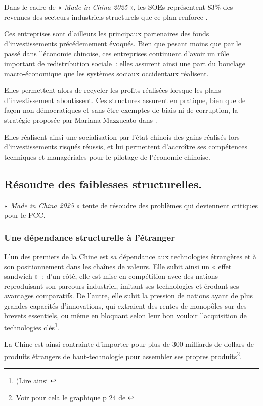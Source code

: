 \documentclass[a4paper]{article}
\begin{document}
Dans le cadre de « \textit{Made in China 2025} », les SOEs représentent 83\% des revenues des secteurs industriels structurels que ce plan renforce \cite{Evolving_MiC25}.

Ces entreprises sont d’ailleurs les principaux partenaires des fonds d’in\-vestis\-sements précédemement évoqués. Bien que pesant moins que par le passé dans l’économie chinoise, ces entreprises continuent d’avoir un rôle important de redistribution sociale~: elles assurent ainsi une part du bouclage macro-économique que les systèmes sociaux occidentaux réalisent.

Elles permettent alors de recycler les profits réalisées lorsque les plans d’in\-vestis\-sement aboutissent. Ces structures assurent en pratique, bien que de façon non démocratiques et sans être exemptes de biais ni de corruption, la stratégie proposée par Mariana Mazzucato dans \cite{mazzucato18}.

Elles réalisent ainsi une socialisation par l’état chinois des gains réalisés lors d’investissements risqués réussis, et lui permettent d’accroître ses compétences techniques et managériales pour le pilotage de l’économie chinoise.

\subsection{Résoudre des faiblesses structurelles.}
\label{sec:orgebd142e}
« \textit{Made in China 2025} » tente de résoudre des problèmes qui deviennent critiques pour le PCC.

\subsubsection{Une dépendance structurelle à l’étranger}
\label{sec:orgd34c67b}
L’un des premiers de la Chine est sa dépendance aux technologies étrangères et à son positionnement dans les chaînes de valeurs. Elle subit ainsi un « effet sandwich »~: d’un côté, elle est mise en compétition avec des nations reproduisant son parcours industriel, imitant ses technologies et érodant ses avantages comparatifs. De l’autre, elle subit la pression de nations ayant de plus grandes capacités d’innovations, qui extraient des rentes de monopôles sur des brevets essentiels, ou même en bloquant selon leur bon vouloir l’acquisition de technologies clés\footnote{(Lire ainsi \cite{dollar20_china}}.

La Chine est ainsi contrainte d’importer pour plus de 300 milliards de dollars de produits étrangers de haut-technologie pour assembler ses propres produits\footnote{Voir pour cela le graphique p 24 de \cite{Evolving_MiC25}}.
\end{document}

